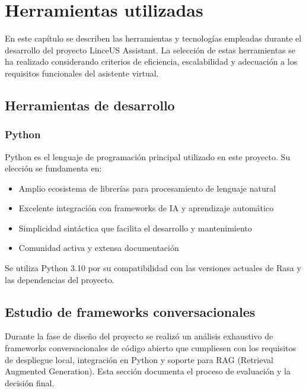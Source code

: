
\chapter{Herramientas utilizadas}\label{cap:herramientas}

En este capítulo se describen las herramientas y tecnologías empleadas durante el desarrollo del proyecto LinceUS Assistant. La selección de estas herramientas se ha realizado considerando criterios de eficiencia, escalabilidad y adecuación a los requisitos funcionales del asistente virtual.

\section{Herramientas de desarrollo}\label{sec:herramientas-desarrollo}

\subsection{Python}

Python es el lenguaje de programación principal utilizado en este proyecto. Su elección se fundamenta en:

\begin{itemize}
    \item Amplio ecosistema de librerías para procesamiento de lenguaje natural
    \item Excelente integración con frameworks de IA y aprendizaje automático
    \item Simplicidad sintáctica que facilita el desarrollo y mantenimiento
    \item Comunidad activa y extensa documentación
\end{itemize}

Se utiliza Python 3.10 por su compatibilidad con las versiones actuales de Rasa y las dependencias del proyecto.

\section{Estudio de frameworks conversacionales}\label{sec:estudio-frameworks}

Durante la fase de diseño del proyecto se realizó un análisis exhaustivo de frameworks conversacionales de código abierto que cumpliesen con los requisitos de despliegue local, integración en Python y soporte para RAG (Retrieval Augmented Generation). Esta sección documenta el proceso de evaluación y la decisión final.

